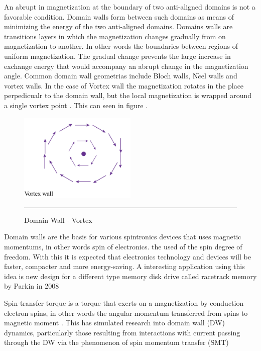 An abrupt in magnetization at the boundary of two anti-aligned domains is not a favorable condition. Domain walls form between such domains as means of minimizing the energy of the two anti-aligned domains. Domains walls are transitions layers in which the magnetization changes gradually from on magnetization to another. In other words the boundaries between regions of uniform magnetization.  The gradual change prevents the large increase in exchange energy that would accompany an abrupt change in the magnetization angle. Common domain wall geometrias include Bloch walls, N$\acute{e}$el walls and vortex walls. In the case of Vortex wall the magnetization rotates in the place perpedicualr to the domain wall, but the local magnetization is wrapped around a single vortex point \cite{spindomain}. This can seen in figure \label{eq:kg4}.

\begin{figure}[htbp]
	\centering
		\includegraphics[width=0.5\textwidth]{Figures/vortex.png}
		\rule{35em}{0.5pt}
	\caption[Domain Wall - Vortex]{Domain Wall - Vortex}
	\label{fig:vortex}
\end{figure}

Domain walls are the basis for various spintronics devices that uses magnetic momentums, in other words spin of electronics. the used of the spin degree of freedom. With this it is expected that electronics technology and devices will be faster, compacter and more energy-saving. A interesting application using this idea is new design for a different type memory disk drive called racetrack memory by Parkin in 2008\cite{racetrack}

Spin-transfer torque is a torque that exerts on a magnetization by conduction electron spins, in other words the angular momentum transferred from spins to magnetic  moment \cite{zhang}.
This has simulated research into domain wall (DW) dynamics, particularly those resulting from interactions with current passing through the DW via the phenomenon of spin momentum transfer (SMT) \cite{handbookspin}

